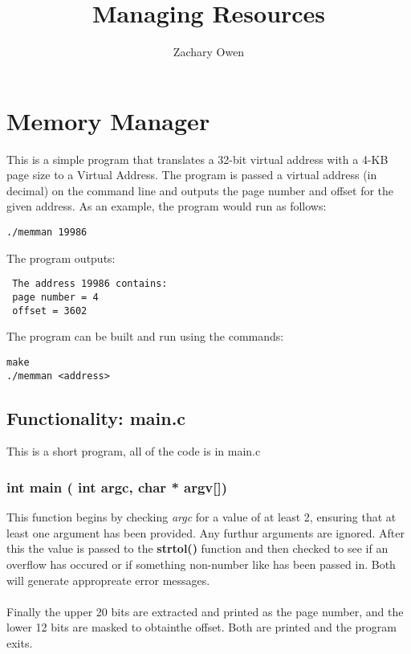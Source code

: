 \documentclass[11pt]{article}
\title{\textbf{Managing Resources}}
\author{Zachary Owen}
\date{}
\begin{document}
\maketitle

\section{Memory Manager}

This is a simple program that translates a 32-bit virtual address with a 4-KB page size to a Virtual Address. The program is passed a virtual address (in decimal) on the command line and  outputs the page number and offset for the given address.  As an example, the program would run as follows: 
\begin{verbatim}
./memman 19986
\end{verbatim}
 The program outputs: 
 \begin{verbatim}
 The address 19986 contains: 
 page number = 4 
 offset = 3602 
 \end{verbatim}
 The program can be built and run using the commands: 
 \begin{verbatim}
make
./memman <address>
\end{verbatim}

\subsection{Functionality: main.c}

This is a short program, all of the code is in main.c

\subsubsection{ int main ( int argc, char * argv[])}

This function begins by checking \textit{argc} for a value of at least 2, ensuring that at least one argument has been provided. Any furthur arguments are ignored. After this the value is passed to the \textbf{strtol()} function and then checked to see if an overflow has occured or if something non-number like has been passed in. Both will generate appropreate error messages.
\\\\
Finally the upper 20 bits are extracted and printed as the page number, and the lower 12 bits are masked to obtainthe offset. Both are printed and the program exits.
\vfill
\end{document}
